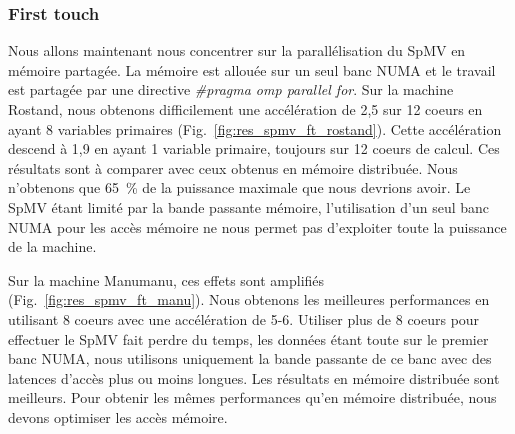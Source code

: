 \subsubsection{First touch}
Nous allons maintenant nous concentrer sur la parallélisation du SpMV en mémoire partagée.
%
La mémoire est allouée sur un seul banc NUMA et le travail est partagée par une directive {\em \#pragma omp parallel for}.
%
Sur la machine Rostand, nous obtenons difficilement une accélération de 2,5 sur 12 coeurs en ayant 8 variables primaires (Fig.~\ref{fig:res_spmv_ft_rostand}).
%
Cette accélération descend à 1,9 en ayant 1 variable primaire, toujours sur 12 coeurs de calcul.
%
Ces résultats sont à comparer avec ceux obtenus en mémoire distribuée.
%
Nous n'obtenons que 65~\% de la puissance maximale que nous devrions avoir.
%
Le SpMV étant limité par la bande passante mémoire, l'utilisation d'un seul banc NUMA pour les accès mémoire ne nous permet pas d'exploiter toute la puissance de la machine.


Sur la machine Manumanu, ces effets sont amplifiés (Fig.~\ref{fig:res_spmv_ft_manu}).
%
Nous obtenons les meilleures performances en utilisant 8 coeurs avec une accélération de 5-6.
%
Utiliser plus de 8 coeurs pour effectuer le SpMV fait perdre du temps, les données étant toute sur le premier banc NUMA, nous utilisons uniquement la bande passante de ce banc avec des latences d'accès plus ou moins longues.
%
Les résultats en mémoire distribuée sont meilleurs.
%
Pour obtenir les mêmes performances qu'en mémoire distribuée, nous devons optimiser les accès mémoire.
